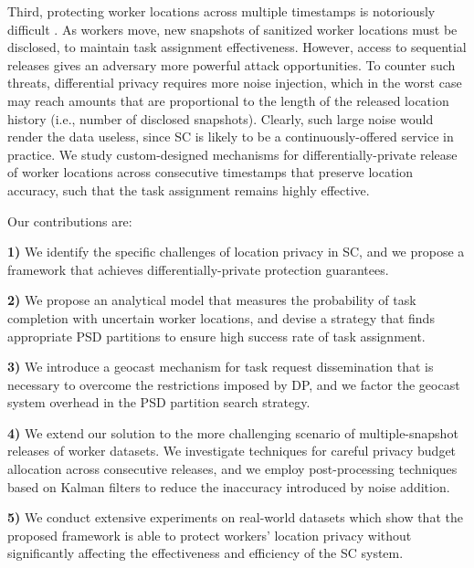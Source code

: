 \documentclass{USC-Thesis}
\numberwithin{equation}{chapter}
\begin{document}
Third, protecting worker locations across multiple timestamps is notoriously difficult \cite{Fan14TKDE}. As workers move, new snapshots of sanitized worker locations must be disclosed, to maintain task assignment effectiveness. However, access to sequential releases gives an adversary more powerful attack opportunities. To counter such threats, differential privacy requires more noise injection, which in the worst case may reach amounts that are proportional to the length of the released location history (i.e., number of disclosed snapshots). Clearly, such large noise would render the data useless, since SC is likely to be a continuously-offered service in practice. We study custom-designed mechanisms for differentially-private release of worker locations across consecutive timestamps that preserve location accuracy, such that the task assignment remains highly effective.

Our contributions are: 
\vspace{0.05in}

\noindent \textbf{1)} We identify the specific challenges of location privacy in SC, and we propose a framework that achieves differentially-private protection guarantees.

\noindent \textbf{2)} We propose an analytical model that measures the probability of task completion with uncertain worker locations, and devise a strategy that finds appropriate PSD partitions to ensure high success rate of task assignment.

\noindent \textbf{3)} We introduce a geocast mechanism for task request dissemination that is necessary to overcome the restrictions imposed by DP, and we factor the geocast system overhead in the PSD partition search strategy.

\noindent \textbf{4)} We extend our solution to the more challenging scenario of multiple-snapshot releases of worker datasets. We investigate techniques for careful privacy budget allocation across consecutive releases, and we employ post-processing techniques based on Kalman filters to reduce the inaccuracy introduced by noise addition.

\noindent \textbf{5)} We conduct extensive experiments on real-world datasets which show that the proposed framework is able to protect workers' location privacy without significantly affecting the effectiveness and efficiency of the SC system.
\end{document}
